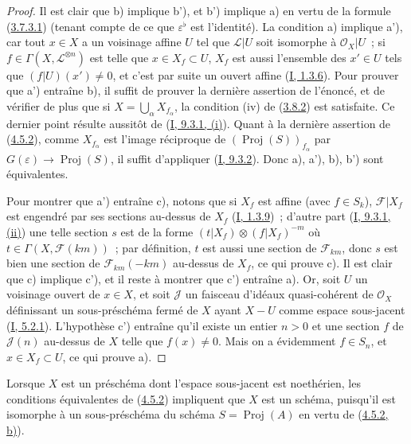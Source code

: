 \begin{proof}
Il est clair que b) implique b'), et b') implique a) en vertu de la formule
(\hyperref[II.3.7.3.1-fr]{3.7.3.1}) (tenant compte de ce que
$\varepsilon^\flat$ est l'identité). La condition a) implique a'), car tout
$x\in X$ a un voisinage affine $U$ tel que
$\mathcal{L}|U$ soit isomorphe à $\mathcal{O}_X|U$~; si
$f\in\Gamma(X,\mathcal{L}^{\otimes n})$ est telle que $x\in X_f\subset U$,
$X_f$ est aussi l'ensemble des $x'\in U$ tels que $(f|U)(x')\neq0$, et c'est
par suite un ouvert affine (\hyperref[I.1.3.6-fr]{I, 1.3.6}). Pour prouver
que a') entraîne b), il suffit de prouver la dernière assertion de l'énoncé,
et de vérifier de plus que si $X=\bigcup_\alpha X_{f_\alpha}$, la condition
(iv) de (\hyperref[II.3.8.2-fr]{3.8.2}) est satisfaite. Ce dernier point
résulte aussitôt de (\hyperref[I.9.3.1-fr]{I, 9.3.1, (i)}). Quant à la
dernière assertion de (\hyperref[II.4.5.2-fr]{4.5.2}), comme
$X_{f_\alpha}$ est l'image réciproque de
$(\operatorname{Proj}(S))_{f_\alpha}$ par
$G(\varepsilon)\to\operatorname{Proj}(S)$, il suffit d'appliquer
(\hyperref[I.9.3.2-fr]{I, 9.3.2}). Donc a), a'), b), b') sont équivalentes.

Pour montrer que a') entraîne c), notons que si $X_f$ est affine (avec
$f\in S_k$), $\mathcal{F}|X_f$ est engendré par ses sections au-dessus de
$X_f$ (\hyperref[I.1.3.9-fr]{I, 1.3.9})~; d'autre part
(\hyperref[I.9.3.1-fr]{I, 9.3.1, (ii)}) une telle section $s$ est de la forme
$(t|X_f)\otimes(f|X_f)^{-m}$ où
$t\in\Gamma(X,\mathcal{F}(km))$~; par définition, $t$ est aussi une section
de $\mathcal{F}_{km}$, donc $s$ est bien une section de
$\mathcal{F}_{km}(-km)$ au-dessus de $X_f$, ce qui prouve c). Il est clair
que c) implique c'), et il reste à montrer que c') entraîne a). Or, soit $U$
un voisinage ouvert de $x\in X$, et soit $\mathcal{J}$ un faisceau d'idéaux
quasi-cohérent de $\mathcal{O}_X$ définissant un sous-préschéma fermé de $X$
ayant $X-U$ comme espace sous-jacent
(\hyperref[I.5.2.1-fr]{I, 5.2.1}). L'hypothèse c') entraîne qu'il existe un
entier $n>0$ et une section $f$ de $\mathcal{J}(n)$ au-dessus de $X$ telle
que $f(x)\neq0$. Mais on a évidemment $f\in S_n$, et $x\in X_f\subset U$, ce
qui prouve a).
\end{proof}

Lorsque $X$ est un préschéma dont l'espace sous-jacent est noethérien, les
conditions équivalentes de (\hyperref[II.4.5.2-fr]{4.5.2}) impliquent que
$X$ est un schéma, puisqu'il est isomorphe à un sous-préschéma du schéma
$S=\operatorname{Proj}(A)$ en vertu de
(\hyperref[II.4.5.2-fr]{4.5.2, b)}).

